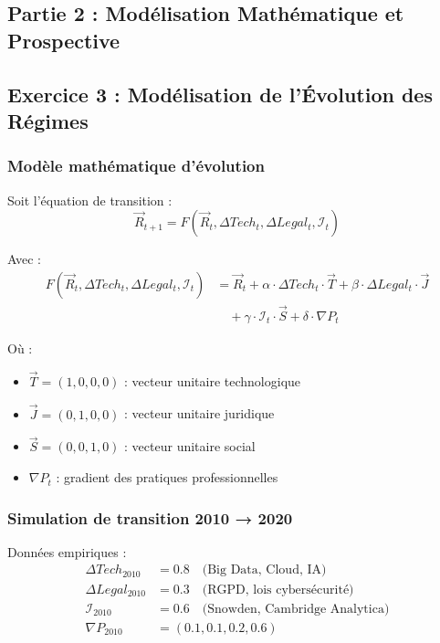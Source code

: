 \documentclass[12pt, a4paper]{article}
\begin{document}
\subsection*{Partie 2 : Modélisation Mathématique et Prospective}

\subsection*{Exercice 3 : Modélisation de l'Évolution des Régimes}

\subsubsection*{Modèle mathématique d'évolution}

Soit l'équation de transition :
\[
\vec{R}_{t+1} = F(\vec{R}_t, \Delta Tech_t, \Delta Legal_t, \mathcal{I}_t)
\]

Avec :
\begin{align*}
F(\vec{R}_t, \Delta Tech_t, \Delta Legal_t, \mathcal{I}_t) &= \vec{R}_t + \alpha \cdot \Delta Tech_t \cdot \vec{T} + \beta \cdot \Delta Legal_t \cdot \vec{J} \\
&\quad + \gamma \cdot \mathcal{I}_t \cdot \vec{S} + \delta \cdot \nabla P_t
\end{align*}

Où :
\begin{itemize}
\item $\vec{T} = (1, 0, 0, 0)$ : vecteur unitaire technologique
\item $\vec{J} = (0, 1, 0, 0)$ : vecteur unitaire juridique
\item $\vec{S} = (0, 0, 1, 0)$ : vecteur unitaire social
\item $\nabla P_t$ : gradient des pratiques professionnelles
\end{itemize}

\subsubsection*{Simulation de transition 2010 → 2020}

Données empiriques :
\begin{align*}
\Delta Tech_{2010} &= 0.8 \quad \text{(Big Data, Cloud, IA)} \\
\Delta Legal_{2010} &= 0.3 \quad \text{(RGPD, lois cybersécurité)} \\
\mathcal{I}_{2010} &= 0.6 \quad \text{(Snowden, Cambridge Analytica)} \\
\nabla P_{2010} &= (0.1, 0.1, 0.2, 0.6)
\end{align*}
\end{document}
